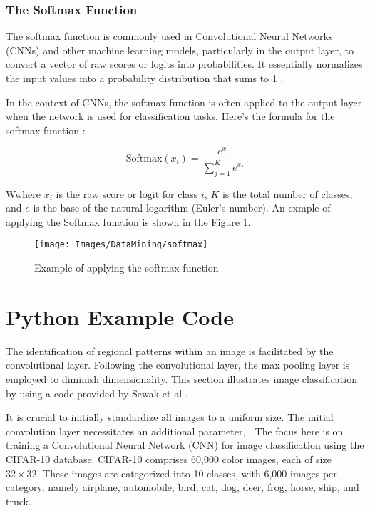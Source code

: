 \subsubsection{The Softmax Function}
\label{Softmax Function}
The softmax function is commonly used in Convolutional Neural Networks (CNNs) and other machine learning models, particularly in the output layer, to convert a vector of raw scores or logits into probabilities. It essentially normalizes the input values into a probability distribution that sums to 1 \cite{Sewak:2018}.

In the context of CNNs, the softmax function is often applied to the output layer when the network is used for classification tasks. Here's the formula for the softmax function \cite{Win:2023}:

\begin{equation}
	\text{Softmax}(x_i) = \frac{e^{x_i}}{\sum_{j=1}^{K} e^{x_j}}
\end{equation}

Wwhere $x_i$ is the raw score or logit for class $i$, $K$ is the total number of classes, and $e$ is the base of the natural logarithm (Euler's number). An exmple of applying the Softmax function is shown in the Figure \ref{fig:softmax}.

\begin{figure}[h!]
	\centering
	\texttt{[image: Images/DataMining/softmax]}
	\caption{Example of applying the softmax function \cite{Sewak:2018}} \label{fig:softmax}
\end{figure}


\section{Python Example Code}
\label{section:DataMiningExampleCode}


The identification of regional patterns within an image is facilitated by the convolutional layer. Following the convolutional layer, the max pooling layer is employed to diminish dimensionality. This section illustrates image classification by using a code provided by Sewak et al \cite{Sewak:2018}.

It is crucial to initially standardize all images to a uniform size. The initial convolution layer necessitates an additional parameter, . The focus here is on training a Convolutional Neural Network (CNN) for image classification using the CIFAR-10 database. CIFAR-10 comprises 60,000 color images, each of size $32 \times 32$. These images are categorized into 10 classes, with 6,000 images per category, namely airplane, automobile, bird, cat, dog, deer, frog, horse, ship, and truck.

